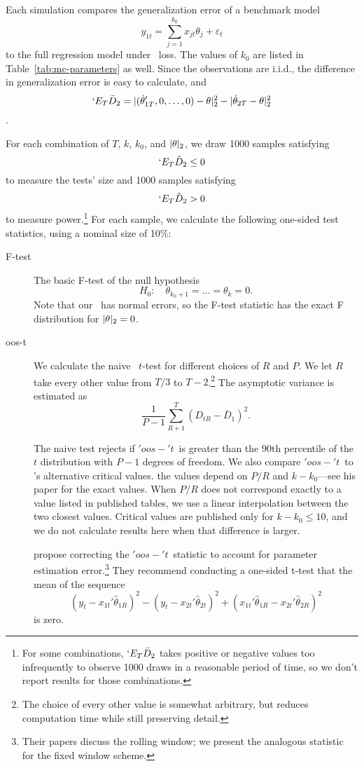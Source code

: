 \documentclass[11pt]{article}
\newcommand{\E}{`E}
\newcommand{\citepos}[1]{\citeauthor{#1}'s \citeyearpar{#1}}
\newcommand{\oost}{\ensuremath{'oos-'t}}
\begin{document}
Each simulation compares the generalization error of a benchmark model
\begin{equation}
  \label{eq:1}
  y_{1t} = \sum_{j=1}^{k_0} x_{jt}\theta_j + \varepsilon_t
\end{equation}
to the full regression model under \mse\ loss.  The values of $k_0$
are listed in Table~\ref{tab:mc-parameters} as well.  Since the
observations are i.i.d., the difference in generalization error is
easy to calculate, and
\[\E_T \bar D_2 = \lvert (\hat\theta_{1T}', 0,\dots, 0) - \theta
\rvert_2^2 - \lvert \hat{\theta}_{2T} - \theta\rvert_2^2 \].

For each combination of $T$, $k$, $k_0$, and $\lvert \theta \rvert_2$,
we draw 1000 samples satisfying 
\[ \E_T \hat{D}_2 \leq 0 \]
to measure the tests' size and 1000 samples satisfying
\[ \E_T \hat{D}_2 > 0 \] to measure power.\footnote{For some
  combinations, $\E_T \bar{D}_2$ takes positive or negative values too
  infrequently to observe 1000 draws in a reasonable period of time,
  so we don't report results for those combinations.}  For each
sample, we calculate the following one-sided test statistics, using a
nominal size of 10\%:

\begin{description}
\item[F-test] The basic F-test of the null hypothesis
  \begin{equation*}
    H_0: \quad \theta_{k_0+1}=\dots=\theta_k=0.
  \end{equation*}
  Note that our \dgp\ has normal errors, so the F-test statistic has
  the exact F distribution for $\lvert \theta \rvert_2 = 0$.
\item[oos-t] We calculate the naive \oos\ $t$-test for different choices
  of $R$ and $P$.  We let $R$ take every other value from $T/3$ to
  $T-2$.\footnote{The choice of every other value is somewhat
    arbitrary, but reduces computation time while still preserving
    detail.}  The asymptotic variance is estimated as 
  \[ \frac1{P-1} \sum_{R+1}^{T} (D_{tR} - \bar D_1)^2. \]

  The naive test rejects if \oost\ is greater than the 90th percentile
  of the $t$ distribution with $P-1$ degrees of freedom.  We also
  compare \oost\ to \citepos{mccracken_asymptotics_2007} alternative
  critical values.  the values depend on $P/R$ and $k - k_0$---see his
  paper for the exact values.  When $P/R$ does not correspond exactly
  to a value listed in published tables, we use a linear interpolation
  between the two closest values.  Critical values are published only
  for $k - k_0 \leq 10$, and we do not calculate results here when
  that difference is larger.

\item[\citet{clark_using_2006,clark_approximately_2007}]
  \citet{clark_using_2006,clark_approximately_2007} propose correcting
  the \oost\ statistic to account for parameter estimation
  error.\footnote{Their papers discuss the rolling window; we present
    the analogous statistic for the fixed window scheme.}
  They recommend conducting a one-sided t-test that the mean of the sequence
  \[ (y_t - x_{1t}'\hat\theta_{1R})^2 - (y_t -
  x_{2t}'\hat{\theta}_{2t})^2 + (x_{1t}'\hat{\theta}_{1R} -
  x_{2t}'\hat\theta_{2R})^{2} \]
  is zero.
\end{description}
\end{document}
